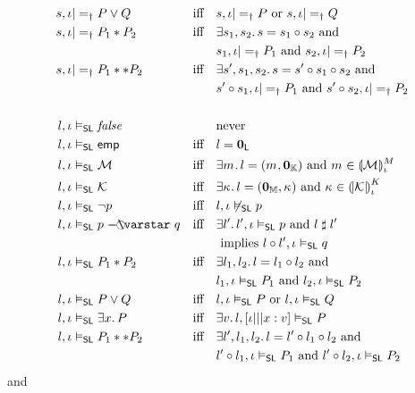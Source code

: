 \begin{definition}
\begin{align*}
%  
  s, \lenv &|=_\dagger P \lor Q
  &&\text{iff}&& s, \lenv |=_\dagger P\text{ or } s, \lenv |=_\dagger Q\\
%    
  s, \lenv &|=_\dagger P_1 * P_2 &&\text{iff}&&
  \exsts{s_1, s_2} s = s_1 \composeL s_2 \text{ and}\\
  &&&&& s_1, \lenv |=_\dagger P_1 \text{ and } s_2, \lenv |=_\dagger P_2\\
%  
  s, \lenv &|=_\dagger P_1 ** P_2 &&\text{iff}&&
  \exsts{s', s_1, s_2} s = s' \composeL s_1 \composeL s_2\text{ and}\\
  &&&&&
  s' \composeL s_1, \lenv |=_\dagger P_1 \text{ and }
  s' \composeL s_2, \lenv |=_\dagger P_2\\\\
%  
%
%
%
  l,\lenv &\slsat \m{false} &&&& \text{never}\\
%  
  l, \lenv &\slsat \emp && \text{iff} && l = \unitL \\
%  
  l, \lenv &\slsat \heapAss{} && \text{iff} && \exsts{\h{}} l = (\h{}, \unitCap) \text{ and } \h{} \in \semH[\lenv]{\heapAss{}} \\
%  
  l, \lenv &\slsat \capAss{} && \text{iff} && \exsts{\ca{}} l = (\unitH, \ca{}) \text{ and } \ca{} \in \semK[\lenv]{\capAss{}} \\
% 
  l, \lenv & \slsat \neg\lass{P} 
  &&\text{iff}&& l, \lenv \not\slsat \lass{P}\\
%
	l, \lenv & \slsat \lass{P} \septraction \lass{Q} &&\text{iff}&&
  \exsts{l'} l', \lenv \slsat \lass{P} \text{ and }
  l \compatible l'\\
  &&&&&\text{ implies } l \composeL l', \lenv \slsat \lass{Q}\\
%  
	l, \lenv &\slsat P_1 * P_2 &&\text{iff}&&
  \exsts{l_1, l_2} l = l_1 \composeL l_2 \text{ and}\\
  &&&&& l_1, \lenv \slsat P_1 \text{ and } l_2, \lenv \slsat P_2\\
%  
  l, \lenv & \slsat P \lor Q
  &&\text{iff}&& l, \lenv \slsat P\text{ or } l, \lenv \slsat Q\\
%
  l, \lenv & \slsat \exsts x P
  &&\text{iff}&& \exsts{v} l, [\lenv|||x:v] \slsat P\\
%    
  l, \lenv &\slsat P_1 ** P_2 &&\text{iff}&&
  \exsts{l', l_1, l_2} l = l' \composeL l_1 \composeL l_2\text{ and}\\
  &&&&&
  l' \composeL l_1, \lenv \slsat P_1 \text{ and }
  l' \composeL l_2, \lenv \slsat P_2
\end{align*}
%
and

\end{definition}
